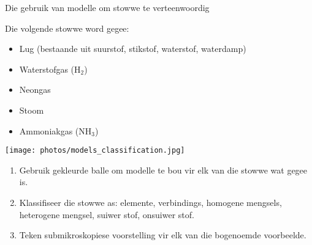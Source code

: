   \label{m38708*eip-326}
\begin{activity}{Die gebruik van modelle om stowwe te verteenwoordig}{
\begin{minipage}{.5\textwidth}
Die volgende stowwe word gegee:
\label{m38708*eip-id1166921187210}
\begin{itemize}[noitemsep]
\item Lug (bestaande uit suurstof, stikstof, waterstof, waterdamp)
\item Waterstofgas ($\text{H}_{2}$)
\item Neongas
\item Stoom
\item Ammoniakgas ($\text{NH}_{3}$)
\end{itemize}
\end{minipage}
\begin{minipage}{.5\textwidth}
\begin{center}
 \texttt{[image: photos/models\_classification.jpg]}\par
\end{center}
\end{minipage}
\noindent
\begin{enumerate}[noitemsep, label=\textbf{\arabic*}.]
\item Gebruik gekleurde balle om modelle te bou vir elk van die stowwe wat gegee is.
\item Klassifiseer die stowwe as: elemente, verbindings, homogene mengsels, heterogene mengsel, suiwer stof, onsuiwer stof.
\item Teken submikroskopiese voorstelling vir elk van die bogenoemde voorbeelde.
\end{enumerate}

}
\end{activity}
\par \label{m38708*secfhsst!!!underscore!!!id212}
